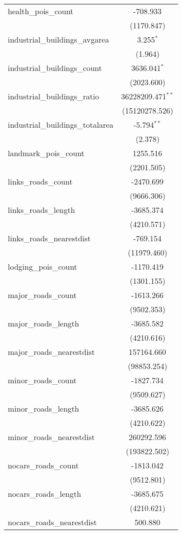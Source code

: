 \begin{table}[!htbp]
\begin{tabular}{@{\extracolsep{5pt}}lc}
 health_pois_count & -708.933$^{}$ \\
  & (1170.847) \\
 industrial_buildings_avgarea & 3.255$^{*}$ \\
  & (1.964) \\
 industrial_buildings_count & 3636.041$^{*}$ \\
  & (2023.600) \\
 industrial_buildings_ratio & 36228209.471$^{**}$ \\
  & (15120278.526) \\
 industrial_buildings_totalarea & -5.794$^{**}$ \\
  & (2.378) \\
 landmark_pois_count & 1255.516$^{}$ \\
  & (2201.505) \\
 links_roads_count & -2470.699$^{}$ \\
  & (9666.306) \\
 links_roads_length & -3685.374$^{}$ \\
  & (4210.571) \\
 links_roads_nearestdist & -769.154$^{}$ \\
  & (11979.460) \\
 lodging_pois_count & -1170.419$^{}$ \\
  & (1301.155) \\
 major_roads_count & -1613.266$^{}$ \\
  & (9502.353) \\
 major_roads_length & -3685.582$^{}$ \\
  & (4210.616) \\
 major_roads_nearestdist & 157164.660$^{}$ \\
  & (98853.254) \\
 minor_roads_count & -1827.734$^{}$ \\
  & (9509.627) \\
 minor_roads_length & -3685.626$^{}$ \\
  & (4210.622) \\
 minor_roads_nearestdist & 260292.596$^{}$ \\
  & (193822.502) \\
 nocars_roads_count & -1813.042$^{}$ \\
  & (9512.801) \\
 nocars_roads_length & -3685.675$^{}$ \\
  & (4210.621) \\
 nocars_roads_nearestdist & 500.880$^{}$ \\

\end{tabular}
\end{table}
